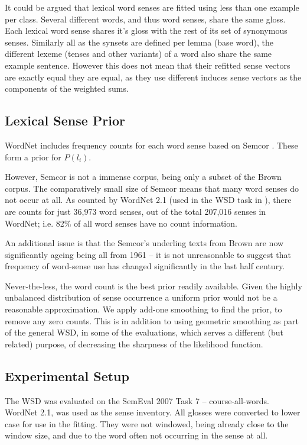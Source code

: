 \documentclass{sig-alternate}
\begin{document}
It could be argued that lexical word senses are fitted using less than one example per class. Several different words, and thus word senses, share the same gloss. Each lexical word sense shares it's gloss with the rest of its set of synonymous senses. Similarly all as the synsets are defined per lemma (base word), the different lexeme (tenses and other variants) of a word also share the same example sentence. However this does not mean that their refitted sense vectors are exactly equal they are equal, as they use different induces sense vectors as the components of the weighted sums.

\subsection{Lexical Sense Prior}
WordNet includes frequency counts for each word sense based on Semcor \textcite{tengi1998design}. These form a prior for $P(l_i)$.

However, Semcor is not a immense corpus, being only a subset of the Brown corpus. The comparatively small size of Semcor means that many word senses do not occur at all. As counted by WordNet 2.1 (used in the WSD task in ), there are counts for just  36,973 word senses, out of the total 207,016 senses in WordNet; i.e. 82\% of all word senses have no count information.

An additional issue is that the Semcor's underling texts from Brown are now significantly ageing being all from 1961 \cite{francis1979brown} -- it is not unreasonable to suggest that frequency of word-sense use has changed significantly in the last half century.

Never-the-less, the word count is the best prior readily available. Given the highly unbalanced distribution of sense occurrence a uniform prior would not be a reasonable approximation.
We apply add-one smoothing to find the prior, to remove any zero counts.
This is in addition to using geometric smoothing as part of the general WSD, in some of the evaluations, which serves a different (but related) purpose, of decreasing the sharpness of the likelihood function.

\subsection {Experimental Setup}
The WSD was evaluated on the SemEval 2007 Task 7 -- course-all-words. 
WordNet 2.1, was used as the sense inventory.
All glosses were converted to lower case for use in the fitting.
They were not windowed, being already close to the window size, and due to the word often not occurring in the sense at all.
\end{document}
